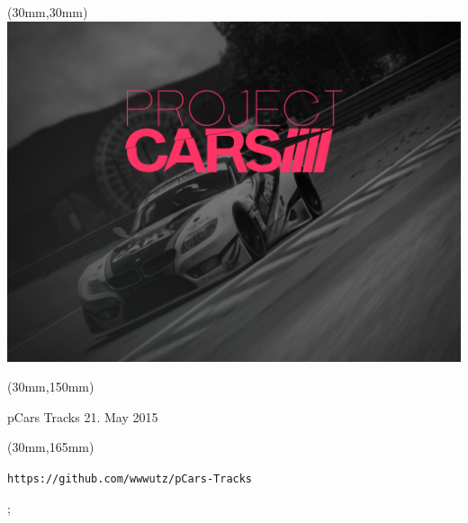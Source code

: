 \documentclass[oneside, a4paper, 12pt]{book}
\begin{document}
\selectfont
\textblockorigin{0cm}{0cm}

\newlength{\Logo}
\setlength{\Logo}{210mm-60mm}
\begin{textblock*}{\Logo}(30mm,30mm)%
\includegraphics[width=\Logo]{pcars-main.png}
\end{textblock*}

\begin{textblock*}{\Logo}(30mm,150mm)%
\begin{center}\Huge{pCars Tracks 21. May 2015}\end{center}
\end{textblock*}

\begin{textblock*}{\Logo}(30mm,165mm)%
\begin{center}\tt\large{https://github.com/wwwutz/pCars-Tracks}\end{center}
\end{textblock*}


;


\end{document}
